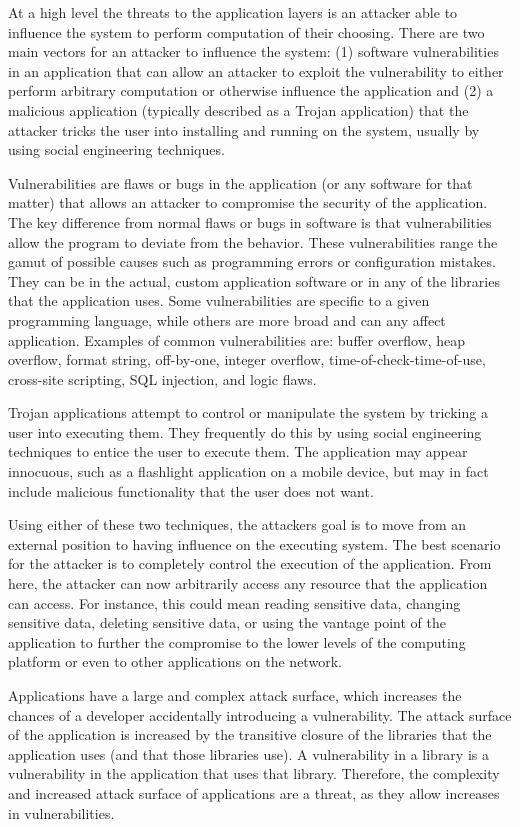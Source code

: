 \documentclass[11pt,letterpaper]{article}
\begin{document}
At a high level the threats to the application layers is an attacker
able to influence the system to perform computation of their choosing.
There are two main vectors for an attacker to influence the system:
(1) software vulnerabilities in an application that can allow an
attacker to exploit the vulnerability to either perform arbitrary
computation or otherwise influence the application and (2) a malicious
application (typically described as a Trojan application) that the
attacker tricks the user into installing and running on the system,
usually by using social engineering techniques. 

Vulnerabilities are flaws or bugs in the application (or any software
for that matter) that allows an attacker to compromise the security of
the application. The key difference from normal flaws or bugs in
software is that vulnerabilities allow the program to deviate from the
behavior. These vulnerabilities range the gamut of possible causes
such as programming errors or configuration mistakes. They can be in
the actual, custom application software or in any of the libraries
that the application uses. Some vulnerabilities are specific to a
given programming language, while others are more broad and can any
affect application. Examples of common vulnerabilities are: buffer
overflow, heap overflow, format string, off-by-one, integer overflow,
time-of-check-time-of-use, cross-site scripting, SQL injection, and
logic flaws.

Trojan applications attempt to control or manipulate the system by
tricking a user into executing them. They frequently do this by using
social engineering techniques to entice the user to execute them. The
application may appear innocuous, such as a flashlight application on
a mobile device, but may in fact include malicious functionality that
the user does not want. 

Using either of these two techniques, the attackers goal is to move
from an external position to having influence on the executing system.
The best scenario for the attacker is to completely control the
execution of the application. From here, the attacker can now
arbitrarily access any resource that the application can access. For
instance, this could mean reading sensitive data, changing sensitive
data, deleting sensitive data, or using the vantage point of the
application to further the compromise to the lower levels of the
computing platform or even to other applications on the network.

Applications have a large and complex attack surface, which increases
the chances of a developer accidentally introducing a vulnerability.
The attack surface of the application is increased by the transitive
closure of the libraries that the application uses (and that those
libraries use). A vulnerability in a library is a vulnerability in the
application that uses that library. Therefore, the complexity and
increased attack surface of applications are a threat, as they allow
increases in vulnerabilities. 
\end{document}
